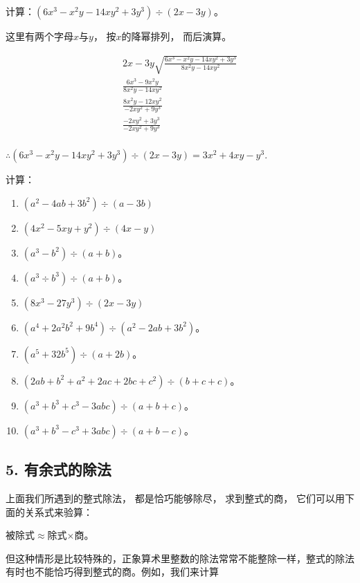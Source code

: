  计算：\((6x^{3}-x^{2}y-14xy^{2}+3y^{3})\div(2x-3y)\)。

 这里有两个字母\(x\)与\(y\)， 按\(x\)的降幂排列，
而后演算。


\[
\begin{array}{l} 2 x - 3 y \sqrt {\frac{6 x ^{3} - x ^{2} y - 14 x y ^{2} + 3 y ^{3}}{8 x ^{2} y - 14 x y ^{2}}} \\ \frac{6 x ^{3} - 9 x ^{2} y}{8 x ^{2} y - 14 x y ^{2}} \\ \frac{8 x ^{2} y - 12 x y ^{2}}{- 2 x y ^{2} + 9 y ^{3}} \\ \frac{- 2 x y ^{2} + 3 y ^{3}}{- 2 x y ^{2} + 9 y ^{3}} \\ \end{array}
\]

\(\therefore (6x^{3} - x^{2}y - 14xy^{2} + 3y^{3})\div (2x - 3y) = 3x^{2} + 4xy - y^{3}.\)

计算：

\begin{enumerate}[start=1]
\item
  \((a^{2} - 4ab + 3b^{2})\div (a - 3b)\)
\item
  \((4x^{2} - 5xy + y^{2})\div (4x - y)\)
\item
  \((a^3 - b^2) \div (a + b)\)。
\item
  \((a^3 \div b^3) \div (a + b)\)。
\item
  \((8x^{3} - 27y^{3})\div (2x - 3y)\)
\item
  \((a^4 + 2a^2b^2 + 9b^4) \div (a^2 - 2ab + 3b^2)\)。
\item
  \((a^5 + 32b^5) \div (a + 2b)\)。
\item
  \((2a b + b^2 + a^2 + 2ac + 2bc + c^2) \div (b + c + c)\)。
\item
  \((a^3 + b^3 + c^3 - 3abc) \div (a + b + c)\)。
\item
  \((a^3 + b^3 - c^3 + 3abc) \div (a + b - c)\)。
\end{enumerate}

\subsection{5. 有余式的除法}

上面我们所遇到的整式除法， 都是恰巧能够除尽， 求到整式的商，
它们可以用下面的关系式来验算：

被除式\(\approx\)除式\(\times\)商。

但这种情形是比较特殊的，正象算术里整数的除法常常不能整除一样，整式的除法有时也不能恰巧得到整式的商。例如，我们来计算

